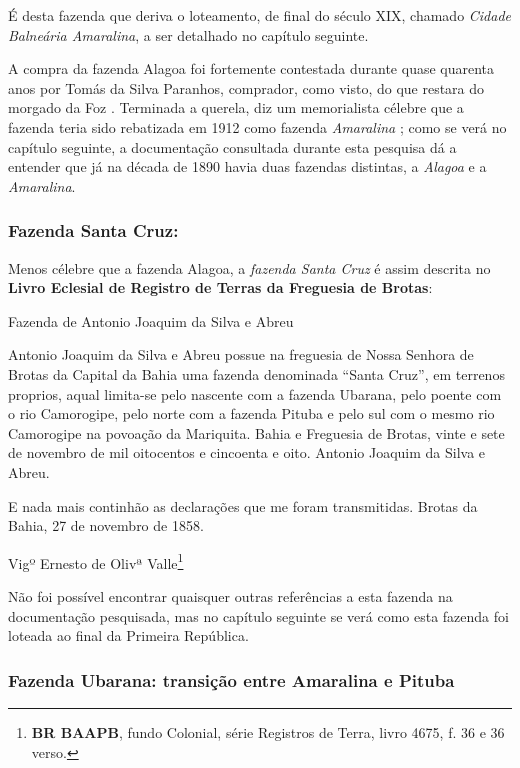 \begin{citacao}
É desta fazenda que deriva o loteamento, de final do século XIX, chamado \textit{Cidade Balneária Amaralina}, a ser detalhado no capítulo seguinte.

A compra da fazenda Alagoa foi fortemente contestada durante quase quarenta anos por Tomás da Silva Paranhos, comprador, como visto, do que restara do morgado da Foz \cite[p.~118]{campos_alagoa_1942}. Terminada a querela, diz um memorialista célebre que a fazenda teria sido rebatizada em 1912 como fazenda \textit{Amaralina} \cite[p.~118]{campos_alagoa_1942}; como se verá no capítulo seguinte, a documentação consultada durante esta pesquisa dá a entender que já na década de 1890 havia duas fazendas distintas, a \textit{Alagoa} e a \textit{Amaralina}.

\subsubsection{Fazenda Santa Cruz: }

Menos célebre que a fazenda Alagoa, a \textit{fazenda Santa Cruz} é assim descrita no \textbf{Livro Eclesial de Registro de Terras da Freguesia de Brotas}:

\begin{citacao}
Fazenda de Antonio Joaquim da Silva e Abreu

Antonio Joaquim da Silva e Abreu possue na freguesia de Nossa Senhora de Brotas da Capital da Bahia uma fazenda denominada ``Santa Cruz'', em terrenos proprios, aqual limita-se pelo nascente com a fazenda Ubarana, pelo poente com o rio Camorogipe, pelo norte com a fazenda Pituba e pelo sul com o mesmo rio Camorogipe na povoação da Mariquita. Bahia e Freguesia de Brotas, vinte e sete de novembro de mil oitocentos e cincoenta e oito. Antonio Joaquim da Silva e Abreu.

E nada mais continhão as declarações que me foram transmitidas. Brotas da Bahia, 27 de novembro de 1858.

Vigº Ernesto de Olivª Valle\footnote{\textbf{BR BAAPB}, fundo Colonial, série Registros de Terra, livro 4675, f. 36 e 36 verso.}
\end{citacao}

Não foi possível encontrar quaisquer outras referências a esta fazenda na documentação pesquisada, mas no capítulo seguinte se verá como esta fazenda foi loteada ao final da Primeira República.

\subsubsection{Fazenda Ubarana: transição entre Amaralina e Pituba}


\end{citacao}
